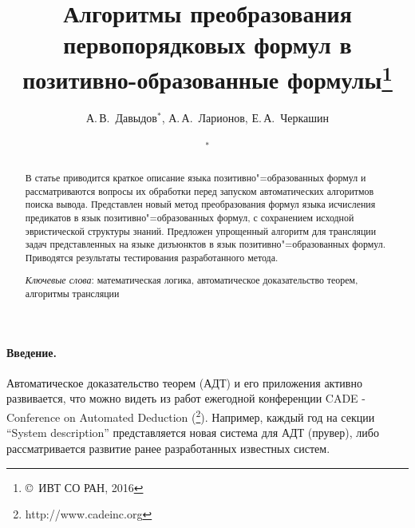 \documentclass[a4paper]{jctart15b}
\begin{document}
\newtheorem{definition}{Определение}
\newtheorem{example}{Пример}

\newcommand{\fictAquantor}{\ensuremath{\forall\colon\varnothing}}
\newcommand{\fictEquantor}{\ensuremath{\exists\colon\varnothing}}
\newcommand{\bomega}{\boldsymbol{\omega}}
\newcommand{\bphi}{\boldsymbol{\phi}}
\newcommand{\eqdef}{\stackrel{\mathrm{df}}{=}}
\newcommand{\bigand}[2]{\raisebox{-2pt}{\ensuremath{\overset{#1}{\underset{#2}{\text{\Large\&\normalfont}}}}}}

\setcounter{page}{1}


\title{Алгоритмы преобразования первопорядковых формул в позитивно-образованные формулы\let\thefootnote\relax\footnote{\copyright\ ИВТ СО РАН, 2016}}

\author{
{\sc А.\,В.~Давыдов${}^*$, А.\,А.~Ларионов, Е.\,А.~Черкашин}\\
\\
$^*$
}

\date{}
\maketitle

\begin{abstract}
  В статье приводится краткое описание языка позитивно"=образованных формул и рассматриваются вопросы их обработки перед запуском автоматических алгоритмов поиска вывода. Представлен новый метод преобразования формул языка исчисления предикатов в язык позитивно"=образованных формул, с сохранением исходной эвристической структуры знаний. Предложен упрощенный алгоритм для трансляции задач представленных на языке дизъюнктов в язык позитивно"=образованных формул. Приводятся результаты тестирования разработанного метода.

    {\it Ключевые слова\/}: математическая логика, автоматическое доказательство теорем, алгоритмы трансляции
\end{abstract}

\paragraph{Введение.}

Автоматическое доказательство теорем (АДТ) и его приложения активно развивается, что можно видеть из работ ежегодной конференции CADE - Conference on Automated Deduction (\footnote{http://www.cadeinc.org}). Например, каждый год на секции “System description” представляется новая система для АДТ (прувер), либо рассматривается развитие ранее разработанных известных систем.
\end{document}
